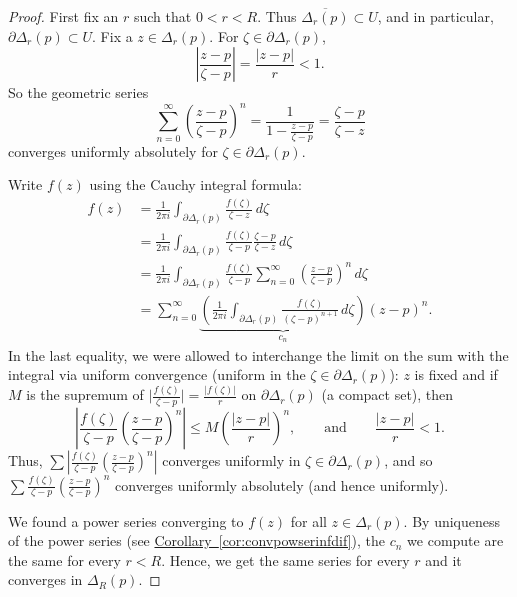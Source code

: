 \documentclass[12pt,openany]{book}
\newcommand{\sabs}[1]{\lvert {#1} \rvert}
\newcommand{\babs}[1]{\bigl\lvert {#1} \bigr\rvert}
\newcommand{\abs}[1]{\left\lvert {#1} \right\rvert}
\theoremstyle{plain}
\theoremstyle{remark}
\theoremstyle{definition}
\theoremstyle{exercise}
\theoremstyle{example}
\newcommand{\corref}[1]{\hyperref[#1]{Corollary~\ref*{#1}}}
\begin{document}
\begin{proof}
First fix an $r$ such that $0 < r < R$.
Thus $\overline{\Delta_r(p)} \subset U$, and in particular,
$\partial \Delta_r(p) \subset U$.
Fix a $z \in \Delta_r(p)$.
For $\zeta \in \partial \Delta_r(p)$, 
\begin{equation*}
\abs{\frac{z-p}{\zeta-p}} =
\frac{\sabs{z-p}}{r} < 1 .
\end{equation*}
So
the geometric series
\begin{equation*}
\sum_{n=0}^\infty
{\left(\frac{z-p}{\zeta-p}\right)}^n
=
\frac{1}{1-\frac{z-p}{\zeta-p}}
=
\frac{\zeta-p}{\zeta-z}
\end{equation*}
converges uniformly absolutely for $\zeta \in \partial \Delta_r(p)$.

Write $f(z)$ using the Cauchy integral formula:
\begin{equation*}
\begin{split}
f(z)
& =
\frac{1}{2\pi i}
\int_{\partial \Delta_r(p)}
\frac{f(\zeta)}{\zeta-z}
\,
d \zeta 
\\
& =
\frac{1}{2\pi i}
\int_{\partial \Delta_r(p)}
\frac{f(\zeta)}{\zeta-p}
\frac{\zeta-p}{\zeta-z}
\,
d \zeta 
\\
& =
\frac{1}{2\pi i}
\int_{\partial \Delta_r(p)}
\frac{f(\zeta)}{\zeta-p}
\sum_{n=0}^\infty
{\left(\frac{z-p}{\zeta-p}\right)}^n
\,
d \zeta 
\\
& =
\sum_{n=0}^\infty
\underbrace{
\left(
\frac{1}{2\pi i}
\int_{\partial \Delta_r(p)}
\frac{f(\zeta)}{{(\zeta-p)}^{n+1}}
\,
d \zeta 
\right)
}_{c_n}
{(z-p)}^n .
\end{split}
\end{equation*}
In the last equality, we were allowed to 
interchange the limit on the sum with the integral
via uniform convergence (uniform in the $\zeta \in \partial \Delta_r(p)$):
$z$ is fixed and if $M$ is the supremum of $\babs{\frac{f(\zeta)}{\zeta-p}} =
\frac{\sabs{f(\zeta)}}{r}$ on $\partial \Delta_r(p)$ (a compact set),
then
\begin{equation*}
\abs{
\frac{f(\zeta)}{\zeta-p}
{\left(\frac{z-p}{\zeta-p}\right)}^n
}
\leq
M 
{\left(\frac{\abs{z-p}}{r}\right)}^n,
\qquad \text{and} \qquad
\frac{\abs{z-p}}{r} < 1 .
\end{equation*}
Thus, $\sum 
\abs{
\frac{f(\zeta)}{\zeta-p}
{\left(\frac{z-p}{\zeta-p}\right)}^n
}$ converges uniformly in $\zeta \in \partial \Delta_r(p)$, and so
$\sum 
\frac{f(\zeta)}{\zeta-p}
{\left(\frac{z-p}{\zeta-p}\right)}^n$ converges uniformly absolutely
(and hence uniformly).

We found a power series converging to $f(z)$ for all $z \in \Delta_r(p)$.
By uniqueness of the power series (see \corref{cor:convpowserinfdif}),
the $c_n$ we compute are the same for every $r < R$.  Hence,
we get the same series for every $r$ and it converges in $\Delta_R(p)$.
\end{proof}
\end{document}
